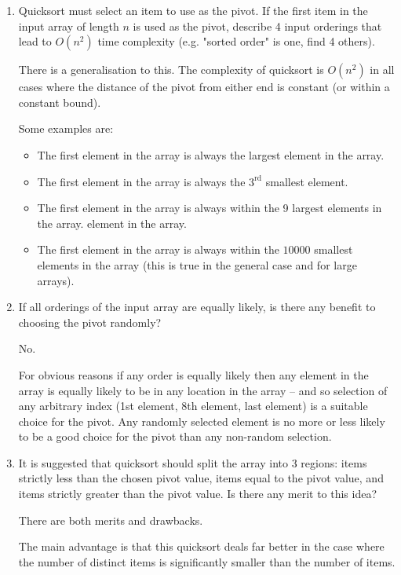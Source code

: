 \documentclass[10pt,\jkfside,a4paper]{article}
\begin{document}
\begin{enumerate}

\item Quicksort must select an item to use as the pivot. If the first item in the input 
array of length $n$ is used as the pivot, describe 4 input orderings that lead to $O(n^2)$ 
time complexity (e.g. "sorted order" is one, find 4 others).

There is a generalisation to this. The complexity of quicksort is $O(n^2)$ in all cases where 
the distance of the pivot from either end is constant (or within a constant bound).

Some examples are:
\begin{itemize}
\item The first element in the array is always the largest element in the array.
\item The first element in the array is always the $3^\text{rd}$ smallest element.
\item The first element in the array is always within the 9 largest elements in the array.
element in the array.
\item The first element in the array is always within the $10000$ smallest elements in the array (this is true 
in the general case and for large arrays).
\end{itemize}

\item If all orderings of the input array are equally likely, is there any benefit to 
choosing the pivot randomly?

No. 

For obvious reasons if any order is equally likely then any element in the array 
is equally likely to be in any location in the array -- and so selection of any arbitrary index 
(1st element, 8th element, last element) is a suitable choice for the pivot. Any randomly 
selected element is no more or less likely to be a good choice for the pivot than any 
non-random selection.

\item It is suggested that quicksort should split the array into 3 regions: items strictly 
less than the chosen pivot value, items equal to the pivot value, and items strictly greater 
than the pivot value. Is there any merit to this idea?

There are both merits and drawbacks.

The main advantage is that this quicksort deals far better in the case where the number of 
distinct items is significantly smaller than the number of items. 


\end{enumerate}
\end{document}
